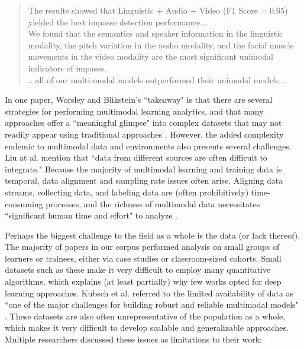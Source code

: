 \documentclass[manuscript,screen,review]{acmart}
\begin{document}
\begin{quote}
    The results showed that Linguistic + Audio + Video (F1 Score = 0.65) yielded the best impasse detection performance...\\

    We found that the semantics and speaker information in the linguistic modality, the pitch variation in the audio modality, and the facial muscle movements in the video modality are the most significant unimodal indicators of impasse.\\

    ...all of our multi-modal models outperformed their unimodal models...
\end{quote}

In one paper, Worsley and Blikstein's ``takeaway" is that there are several strategies for performing multimodal learning analytics, and that many approaches offer a ``meaningful glimpse" into complex datasets that may not readily appear using traditional approaches \cite{3095923626}. However, the added complexity endemic to multimodal data and environments also presents several challenges. Liu at al. \cite{3783339081} mention that ``data from different sources are often difficult to integrate." Because the majority of multimodal learning and training data is temporal, data alignment and sampling rate issues often arise. Aligning data streams, collecting data, and labeling data are (often prohibitively) time-consuming processes, and the richness of multimodal data necessitates ``significant human time and effort" to analyze \cite{3796180663}.  

Perhaps the biggest challenge to the field as a whole is the data (or lack thereof). The majority of papers in our corpus performed analysis on small groups of learners or trainees, either via case studies or classroom-sized cohorts. Small datasets such as these make it very difficult to employ many quantitative algorithms, which explains (at least partially) why few works opted for deep learning approaches. Kubsch et al. referred to the limited availability of data as ``one of the major challenges for building robust and reliable multimodal models" \cite{32184286}. These datasets are also often unrepresentative of the population as a whole, which makes it very difficult to develop scalable and generalizable approaches. Multiple researchers discussed these issues as limitations to their work:
\end{document}
